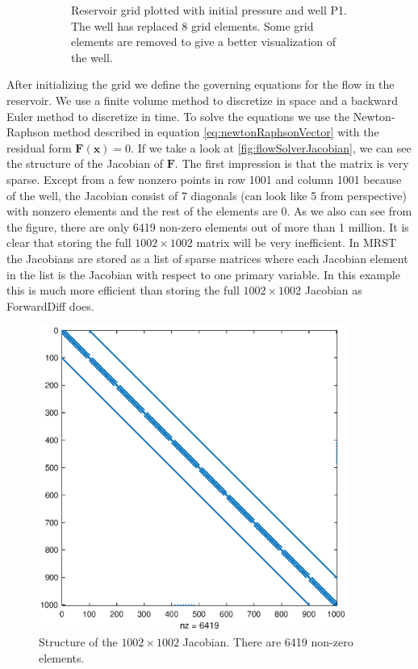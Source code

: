 \begin{figure}[htbp]
\begin{subfigure}[t]{0.49\textwidth}
        \caption{Reservoir grid plotted with initial pressure and well P1. The well has replaced 8 grid elements. Some grid elements are removed to give a better visualization of the well.}
        \label{fig:flowSolverGridWithWell}
    \end{subfigure}
    \caption{}
\end{figure}
After initializing the grid we define the governing equations for the flow in the reservoir. We use a finite volume method to discretize in space and a backward Euler method to discretize in time. To solve the equations we use the Newton-Raphson method described in equation \eqref{eq:newtonRaphsonVector} with the residual form $\boldsymbol{F}(\boldsymbol{x}) = 0$. If we take a look at \autoref{fig:flowSolverJacobian}, we can see the structure of the Jacobian of $\boldsymbol{F}$. The first impression is that the matrix is very sparse. Except from a few nonzero points in row 1001 and column 1001 because of the well, the Jacobian consist of 7 diagonals (can look like 5 from perspective) with nonzero elements and the rest of the elements are 0. As we also can see from the figure, there are only 6419 non-zero elements out of more than 1 million. It is clear that storing the full $1002\times 1002$ matrix will be very inefficient. In MRST the Jacobians are stored as a list of sparse matrices where each Jacobian element in the list is the Jacobian with respect to one primary variable. In this example this is much more efficient than storing the full $1002\times 1002$ Jacobian as ForwardDiff does.

\begin{figure}[htbp]
    \centering
    \includegraphics[width = 0.9\textwidth]{figures/flowSolver_Jacobian.eps}
    \caption{Structure of the $1002\times 1002$ Jacobian. There are 6419 non-zero elements.}
    \label{fig:flowSolverJacobian}
\end{figure}
